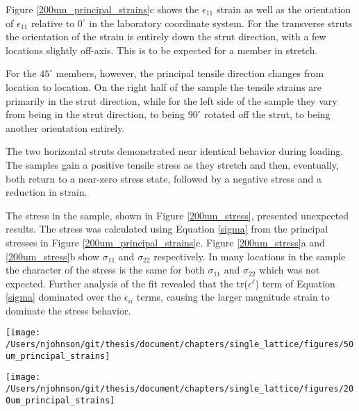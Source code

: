 Figure \ref{200um_principal_strains}c shows the $\epsilon_{11}$ strain as well as the orientation of $\epsilon_{11}$ relative to $0^\circ$ in the laboratory coordinate system. For the transverse struts the orientation of the strain is entirely down the strut direction, with a few locations slightly off-axis. This is to be expected for a member in stretch. 

For the $45^\circ$ members, however, the principal tensile direction changes from location to location. On the right half of the sample the tensile strains are primarily in the strut direction, while for the left side of the sample they vary from being in the strut direction, to being $90^\circ$ rotated off the strut, to being another orientation entirely.


The two horizontal struts demonstrated near identical behavior during loading. The samples gain a positive tensile stress as they stretch and then, eventually, both return to a near-zero stress state, followed by a negative stress and a reduction in strain.

The stress in the sample, shown in Figure \ref{200um_stress}, presented unexpected results. The stress was calculated using Equation \ref{sigma} from the principal stresses in Figure \ref{200um_principal_strains}c. Figure \ref{200um_stress}a and \ref{200um_stress}b show $\sigma_{11}$ and $\sigma_{22}$ respectively. In many locations in the sample the character of the stress is the same for both $\sigma_{11}$ and $\sigma_{22}$ which was not expected. Further analysis of the fit revealed that the tr($\epsilon^\ell$) term of Equation \ref{sigma} dominated over the $\epsilon_{ii}$ terms, causing the larger magnitude strain to dominate the stress behavior. 


\begin{figure*}
	\texttt{[image: /Users/njohnson/git/thesis/document/chapters/single\_lattice/figures/50um\_principal\_strains]}
	\caption{The principal strains and orientation of the principal coordinate system at a macroscopic displacement of 50um on the sample.}
	\label{50um_principal_strains}
\end{figure*}

\begin{figure*}
	\texttt{[image: /Users/njohnson/git/thesis/document/chapters/single\_lattice/figures/200um\_principal\_strains]}
	\caption{The principal strains and orientation of the principal coordinate system at a macroscopic displacement of 200um on the sample.}
	\label{200um_principal_strains}
\end{figure*}

